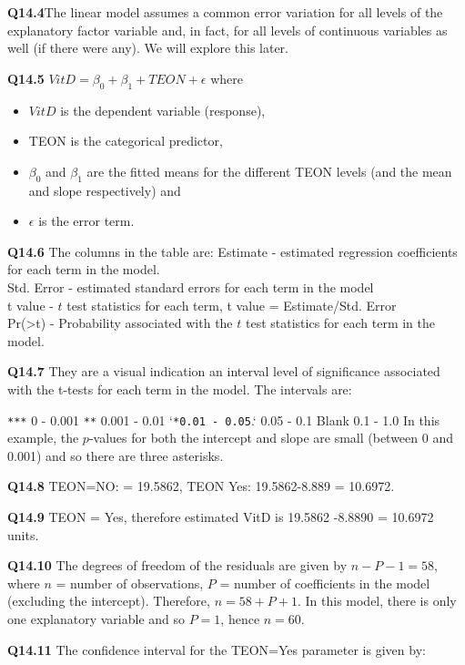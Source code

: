 \documentclass[
  oneside]{krantz}
\providecommand{\tightlist}{%
  \setlength{\itemsep}{0pt}\setlength{\parskip}{0pt}}
\begin{document}
\textbf{Q14.4}The linear model assumes a common error variation for all levels of the explanatory factor variable and, in fact, for all levels of continuous variables as well (if there were any). We will explore this later.

\textbf{Q14.5} \(VitD =\beta_0+\beta_1+TEON +\epsilon\)
where

\begin{itemize}
\tightlist
\item
  \(VitD\) is the dependent variable (response),
\item
  TEON is the categorical predictor,
\item
  \(\beta_0\) and \(\beta_1\) are the fitted means for the different TEON levels (and the mean and slope respectively) and
\item
  \(\epsilon\) is the error term.
\end{itemize}

\textbf{Q14.6} The columns in the table are:
Estimate - estimated regression coefficients for each term in the model.\\
Std. Error - estimated standard errors for each term in the model\\
t value - \(t\) test statistics for each term, t value = Estimate/Std. Error\\
Pr(\textgreater\textbar t\textbar) - Probability associated with the \(t\) test statistics for each term in the model.

\textbf{Q14.7} They are a visual indication an interval level of significance associated with the t-tests for each term in the model. The intervals are:

\texttt{***} 0 - 0.001
\texttt{**} 0.001 - 0.01
`\texttt{*0.01\ -\ 0.05}.` 0.05 - 0.1
Blank 0.1 - 1.0
In this example, the \(p\)-values for both the intercept and slope are small (between 0 and 0.001) and so there are three asterisks.

\textbf{Q14.8} TEON=NO: = 19.5862, TEON Yes: 19.5862-8.889 = 10.6972.

\textbf{Q14.9} TEON = Yes, therefore estimated VitD is 19.5862 -8.8890
= 10.6972 units.

\textbf{Q14.10} The degrees of freedom of the residuals are given by \(n - P - 1 = 58\), where \(n\) = number of observations, \(P\) = number of coefficients in the model (excluding the intercept). Therefore, \(n = 58 + P + 1\). In this model, there is only one explanatory variable and so \(P = 1\), hence \(n = 60\).

\textbf{Q14.11} The confidence interval for the TEON=Yes parameter is given by:
\end{document}
